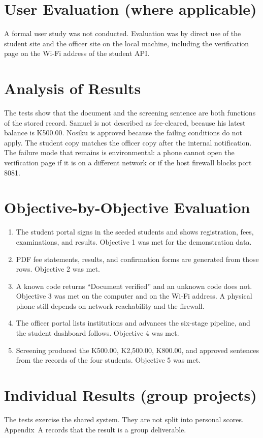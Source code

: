 \documentclass[12pt,a4paper]{report}
\begin{document}
\section{User Evaluation (where applicable)}
A formal user study was not conducted. Evaluation was by direct use of the student site and the officer site on the local machine, including the verification page on the Wi-Fi address of the student API.

\section{Analysis of Results}
The tests show that the document and the screening sentence are both functions of the stored record. Samuel is not described as fee-cleared, because his latest balance is K500.00. Nosiku is approved because the failing conditions do not apply. The student copy matches the officer copy after the internal notification. The failure mode that remains is environmental: a phone cannot open the verification page if it is on a different network or if the host firewall blocks port 8081.

\section{Objective-by-Objective Evaluation}
\begin{enumerate}
    \item The student portal signs in the seeded students and shows registration, fees, examinations, and results. Objective 1 was met for the demonstration data.
    \item PDF fee statements, results, and confirmation forms are generated from those rows. Objective 2 was met.
    \item A known code returns ``Document verified'' and an unknown code does not. Objective 3 was met on the computer and on the Wi-Fi address. A physical phone still depends on network reachability and the firewall.
    \item The officer portal lists institutions and advances the six-stage pipeline, and the student dashboard follows. Objective 4 was met.
    \item Screening produced the K500.00, K2,500.00, K800.00, and approved sentences from the records of the four students. Objective 5 was met.
\end{enumerate}

\section{Individual Results (group projects)}
The tests exercise the shared system. They are not split into personal scores. Appendix~A records that the result is a group deliverable.
\end{document}
